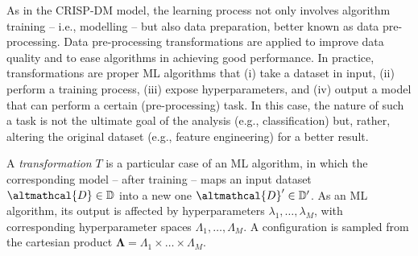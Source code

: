 As in the CRISP-DM model, the learning process not only involves algorithm training -- i.e., modelling -- but also data preparation, better known as data pre-processing.
Data pre-processing transformations are applied to improve data quality and to ease algorithms in achieving good performance.
In practice, transformations are proper ML algorithms that (i) take a dataset in input, (ii) perform a training process, (iii) expose hyperparameters, and (iv) output a model that can perform a certain (pre-processing) task.
In this case, the nature of such a task is not the ultimate goal of the analysis (e.g., classification) but, rather, altering the original dataset (e.g., feature engineering) for a better result.

\begin{definition}
    A \emph{transformation} $T$ is a particular case of an ML algorithm, in which the corresponding model -- after training -- maps an input dataset $\altmathcal{D} \in \mathbb{D}$ into a new one $\altmathcal{D}' \in \mathbb{D}'$.
    As an ML algorithm, its output is affected by hyperparameters $\lambda_1, \dots, \lambda_M$, with corresponding hyperparameter spaces $\Lambda_1, \dots, \Lambda_M$.
    A configuration is sampled from the cartesian product $\pmb{\Lambda} = \Lambda_1 \times \ldots \times \Lambda_M$.
\end{definition}

